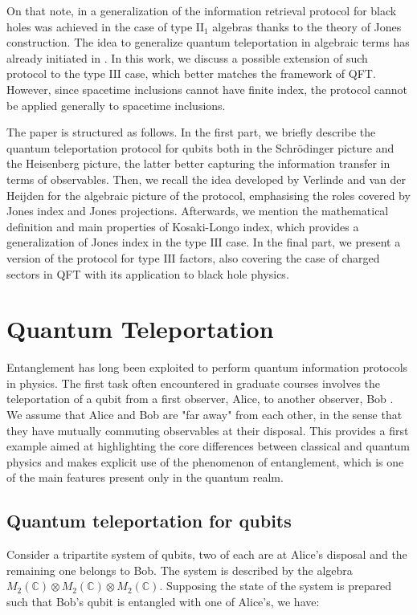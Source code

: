 \documentclass[a4paper,11pt]{article}
\begin{document}
On that note, in \cite{Verlinde} a generalization of the information retrieval protocol for black holes was achieved in the case of type $\mathrm{II}_1$ algebras thanks to the theory of Jones construction. The idea to generalize quantum teleportation in algebraic terms has already initiated in \cite{Conlon}. In this work, we discuss a possible extension of such protocol to the type $\mathrm{III}$ case, which better matches the framework of QFT. However, since spacetime inclusions cannot have finite index, the protocol cannot be applied generally to spacetime inclusions.

The paper is structured as follows.
In the first part, we briefly describe the quantum teleportation protocol for qubits both in the Schrödinger picture and the Heisenberg picture, the latter better capturing the information transfer in terms of observables.
Then, we recall the idea developed by Verlinde and van der Heijden for the algebraic picture of the protocol, emphasising the roles covered by Jones index and Jones projections.
Afterwards, we mention the mathematical definition and main properties of Kosaki-Longo index, which provides a generalization of Jones index in the type $\mathrm{III}$ case.
In the final part, we present a version of the protocol for type $\mathrm{III}$ factors, also covering the case of charged sectors in QFT with its application to black hole physics.

\section{Quantum Teleportation}
Entanglement \cite{Schrodinger} \cite{EPR} has long been exploited to perform quantum information protocols in physics. The first task often encountered in graduate courses involves the teleportation of a qubit from a first observer, Alice, to another observer, Bob \cite{Teleportation}. We assume that Alice and Bob are "far away" from each other, in the sense that they have mutually commuting observables at their disposal. 
This provides a first example aimed at highlighting the core differences between classical and quantum physics and makes explicit use of the phenomenon of entanglement, which is one of the main features present only in the quantum realm.

\subsection{Quantum teleportation for qubits}

Consider a tripartite system of qubits, two of each are at Alice's disposal and the remaining one belongs to Bob. The system is described by the algebra $M_2(\mathbb{C}) \otimes M_2(\mathbb{C}) \otimes M_2(\mathbb{C})$. Supposing the state of the system is prepared such that Bob's qubit is entangled with one of Alice's, we have:
\end{document}
